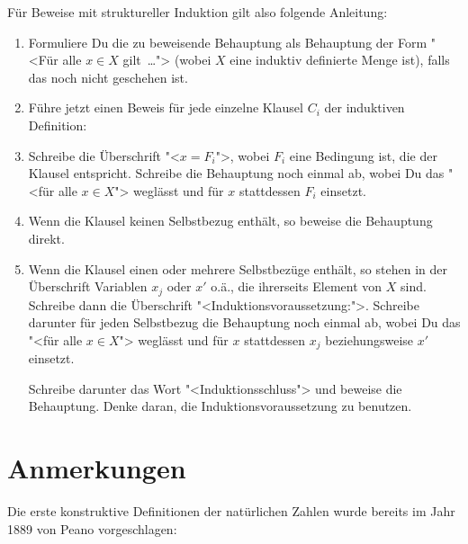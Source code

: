 Für Beweise mit struktureller Induktion gilt also folgende Anleitung:
%
\begin{enumerate}
\item Formuliere Du die zu beweisende Behauptung als
  Behauptung der Form "<Für alle $x\in X$ gilt~\ldots"> (wobei $X$
  eine induktiv definierte Menge ist), falls das noch nicht geschehen
  ist.
\item Führe jetzt einen Beweis für jede einzelne Klausel $C_i$
  der induktiven Definition:
\item Schreibe die Überschrift "<$x = F_i$">, wobei $F_i$ eine
  Bedingung ist, die der Klausel entspricht.  Schreibe die
  Behauptung noch einmal ab, wobei Du das "<für alle $x\in X$">
  weglässt und für $x$ stattdessen $F_i$ einsetzt.
\item Wenn die Klausel keinen Selbstbezug enthält, so beweise die
  Behauptung direkt.
\item Wenn die Klausel einen oder mehrere Selbstbezüge enthält, so
  stehen in der Überschrift Variablen $x_j$ oder $x'$ o.ä., die
  ihrerseits Element von $X$ sind.  Schreibe dann die Überschrift
  "<Induktionsvoraussetzung:">. Schreibe darunter für jeden
  Selbstbezug die Behauptung noch einmal ab, wobei Du das "<für alle
  $x\in X$"> weglässt und für $x$ stattdessen $x_j$ beziehungsweise $x'$
  einsetzt.

  Schreibe darunter das Wort "<Induktionsschluss"> und beweise
  die Behauptung.  Denke daran, die Induktionsvoraussetzung zu
  benutzen.
\end{enumerate}

\section*{Anmerkungen}

Die erste konstruktive Definitionen der natürlichen Zahlen wurde
bereits im Jahr 1889 von {\sc Peano} vorgeschlagen:

